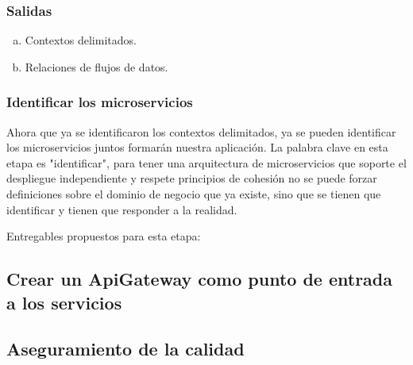\subsubsection*{Salidas}
\begin{enumerate}[a.]
    \item Contextos delimitados.
    \item Relaciones de flujos de datos.
\end{enumerate}


\subsubsection{Identificar los microservicios}

Ahora que ya se identificaron los contextos delimitados, ya se pueden identificar los microservicios
juntos formarán nuestra aplicación.
La palabra clave en esta etapa es "identificar", para tener una arquitectura de microservicios que soporte
el despliegue independiente y respete principios de cohesión no se puede forzar definiciones sobre el
dominio de negocio que ya existe, sino que se tienen que identificar y tienen que responder a la realidad.




Entregables propuestos para esta etapa:

\subsection{Crear un ApiGateway como punto de entrada a los servicios}

\subsection{Aseguramiento de la calidad}
